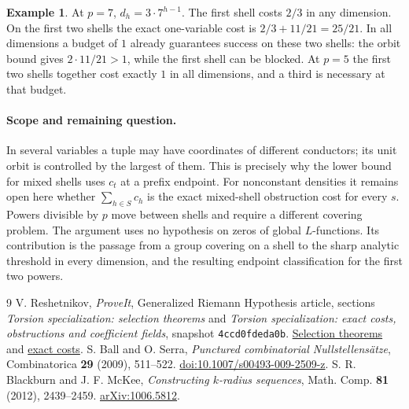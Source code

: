 \documentclass[11pt]{article}
\theoremstyle{definition}\newtheorem{example}[theorem]{Example}
\begin{document}
\begin{example}
At $p=7$, $d_h=3\cdot7^{h-1}$. The first shell costs $2/3$ in any
dimension. On the first two shells the exact one-variable cost is
$2/3+11/21=25/21$. In all dimensions a budget of $1$ already guarantees
success on these two shells: the orbit bound gives $2\cdot11/21>1$,
while the first shell can be blocked. At $p=5$ the first two shells
together cost exactly $1$ in all dimensions, and a third is necessary
at that budget.
\end{example}

\paragraph{Scope and remaining question.}
In several variables a tuple may have coordinates of different conductors;
its unit orbit is controlled by the largest of them. This is precisely
why the lower bound for mixed shells uses $c_t$ at a prefix endpoint.
For nonconstant densities it remains open here whether $\sum_{h\in S}c_h$
is the exact mixed-shell obstruction cost for every $s$. Powers divisible
by $p$ move between shells and require a different covering problem.
The argument uses no hypothesis on zeros of global $L$-functions.
Its contribution is the passage from a group covering on a shell to the
sharp analytic threshold in every dimension, and the resulting endpoint
classification for the first two powers.

\begin{thebibliography}{9}
 V. Reshetnikov, \emph{ProveIt}, Generalized Riemann
Hypothesis article, sections \emph{Torsion specialization: selection theorems}
and \emph{Torsion specialization: exact costs, obstructions and coefficient
fields}, snapshot \texttt{4ccd0fdeda0b}.\enspace
\href{https://github.com/VladimirReshetnikov/ProveIt/blob/4ccd0fdeda0b1cc316d2dfdccfdbcfea9d4b77fb/Analysis/GeneralizedRiemannHypothesis/Article/sections/tors.tex}{Selection theorems}
\enspace and\enspace
\href{https://github.com/VladimirReshetnikov/ProveIt/blob/4ccd0fdeda0b1cc316d2dfdccfdbcfea9d4b77fb/Analysis/GeneralizedRiemannHypothesis/Article/sections/cost.tex}{exact costs}.
 S. Ball and O. Serra, \emph{Punctured combinatorial
Nullstellens\"atze}, Combinatorica \textbf{29} (2009), 511--522.
\href{https://doi.org/10.1007/s00493-009-2509-z}{doi:10.1007/s00493-009-2509-z}.
 S. R. Blackburn and J. F. McKee,
\emph{Constructing $k$-radius sequences}, Math. Comp. \textbf{81} (2012),
2439--2459. \href{https://arxiv.org/abs/1006.5812}{arXiv:1006.5812}.
\end{thebibliography}
\end{document}

